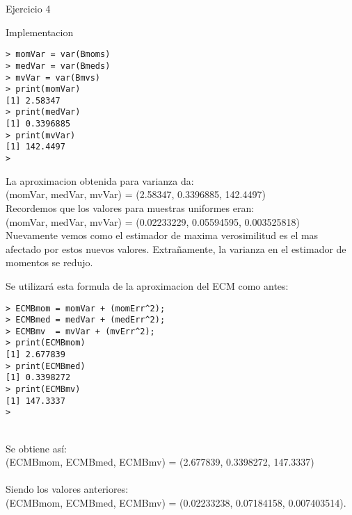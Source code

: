 \begin{section}{Ejercicio 4}
\begin{subsection}{Implementacion}
\begin{verbatim}
> momVar = var(Bmoms)
> medVar = var(Bmeds)
> mvVar = var(Bmvs)
> print(momVar)
[1] 2.58347
> print(medVar)
[1] 0.3396885
> print(mvVar)
[1] 142.4497
> 

\end{verbatim}

La aproximacion obtenida para varianza da: \\
(momVar, medVar, mvVar) = (2.58347, 0.3396885, 142.4497)\\
Recordemos que los valores para muestras uniformes eran:\\
(momVar, medVar, mvVar) = (0.02233229, 0.05594595, 0.003525818)\\
Nuevamente vemos como el estimador de maxima verosimilitud es el mas afectado por estos nuevos valores.
Extrañamente, la varianza en el estimador de momentos se redujo.



Se utilizará esta formula de la aproximacion del ECM como antes:

\begin{verbatim}
> ECMBmom = momVar + (momErr^2);
> ECMBmed = medVar + (medErr^2);
> ECMBmv  = mvVar + (mvErr^2);
> print(ECMBmom)
[1] 2.677839
> print(ECMBmed)
[1] 0.3398272
> print(ECMBmv)
[1] 147.3337
> 
\end{verbatim}
~\\
Se obtiene así:\\
(ECMBmom, ECMBmed, ECMBmv) = (2.677839, 0.3398272, 147.3337)\\
~\\
Siendo los valores anteriores:\\
 (ECMBmom, ECMBmed, ECMBmv) = (0.02233238, 0.07184158, 0.007403514).
 \\
 ~\\


\end{subsection}
\end{section}